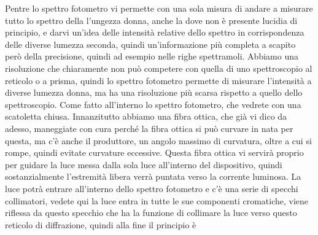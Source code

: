 {Pentre lo spettro fotometro vi permette con una sola misura di andare a misurare tutto lo spettro della l'ungezza donna, anche la dove non è presente lucidia di principio, e darvi un'idea delle intensità relative dello spettro in corrispondenza delle diverse lumezza seconda, quindi un'informazione più completa a scapito però della precisione, quindi ad esempio nelle righe spettramoli. Abbiamo una risoluzione che chiaramente non può competere con quella di uno spettroscopio al reticolo o a prisma, quindi lo spettro fotometro permette di misurare l'intensità a diverse lumezza donna, ma ha una risoluzione più scarsa rispetto a quello dello spettroscopio. Come fatto all'interno lo spettro fotometro, che vedrete con una scatoletta chiusa. Innanzitutto abbiamo una fibra ottica, che già vi dico da adesso, maneggiate con cura perché la fibra ottica si può curvare in nata per questa, ma c'è anche il produttore, un angolo massimo di curvatura, oltre a cui si rompe, quindi evitate curvature eccessive. Questa fibra ottica vi servirà proprio per guidare la luce messa dalla sola luce all'interno del dispositivo, quindi sostanzialmente l'estremità libera verrà puntata verso la corrente luminosa. La luce potrà entrare all'interno dello spettro fotometro e c'è una serie di specchi collimatori, vedete qui la luce entra in tutte le sue componenti cromatiche, viene riflessa da questo specchio che ha la funzione di collimare la luce verso questo reticolo di diffrazione, quindi alla fine il principio è 

}
